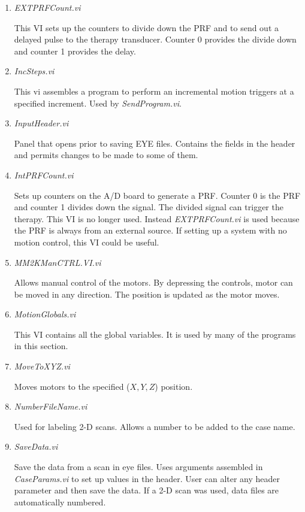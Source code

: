 \documentclass[10pt]{article}
\begin{document}
\begin{enumerate}
\item {\it EXTPRFCount.vi}

This VI sets up the counters to divide down the PRF and to send
out a delayed pulse to the therapy transducer. Counter 0 provides
the divide down and counter 1 provides the delay.

\item {\it IncSteps.vi}

This vi assembles a program to perform an incremental motion
triggers at a specified increment. Used by {\it SendProgram.vi}.

\item {\it InputHeader.vi}

Panel that opens prior to saving EYE files. Contains the fields in
the header and permits changes to be made to some of them.

\item {\it IntPRFCount.vi}

Sets up counters on the A/D board to generate a PRF. Counter 0 is
the PRF and counter 1 divides down the signal. The divided signal
can trigger the therapy. This VI is no longer used. Instead {\it
EXTPRFCount.vi} is used because the PRF is always from an external
source. If setting up a system with no motion control, this VI
could be useful.


\item {\it MM2KManCTRL.VI.vi}

Allows manual control of the motors. By depressing the controls,
motor can be moved in any direction. The position is updated as
the motor moves.

\item {\it MotionGlobals.vi}

This VI contains all the global variables. It is used by many of
the programs in this section.

\item {\it MoveToXYZ.vi}

Moves motors to the specified ($X,Y,Z$) position.

\item {\it NumberFileName.vi}

Used for labeling 2-D scans. Allows a number to be added to the
case name.


\item {\it SaveData.vi}

Save the data from a scan in eye files. Uses arguments assembled
in {\it CaseParams.vi} to set up values in the header. User can
alter any header parameter and then save the data. If a 2-D scan
was used, data files are automatically numbered.


\end{enumerate}
\end{document}
